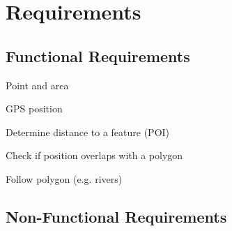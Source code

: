 \section{Requirements}


\subsection{Functional Requirements}
\reqstartF
	\item Point and area
	\item GPS position
	\item Determine distance to a feature (POI)
	\item Check if position overlaps with a polygon
	\item Follow polygon (e.g. rivers)
\reqendF


\subsection{Non-Functional Requirements}
